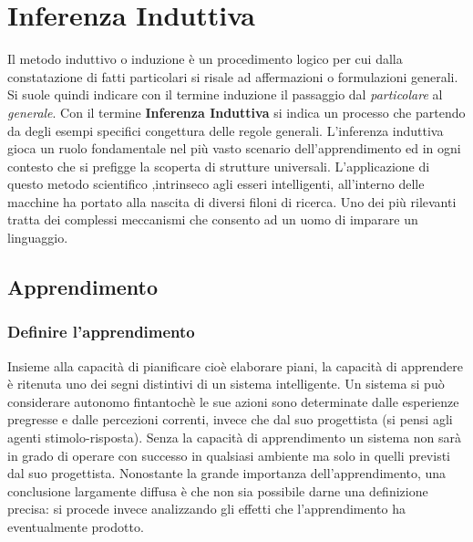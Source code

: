 
\chapter{Inferenza Induttiva} %
\label{cap:uno}

Il metodo induttivo o induzione è un procedimento logico per cui dalla constatazione di fatti particolari si risale ad affermazioni o formulazioni generali.
Si suole quindi indicare con il termine induzione  il passaggio dal \textit{particolare} al \textit{generale}.
Con il termine \textbf{Inferenza Induttiva} si indica un processo che partendo da degli esempi specifici congettura delle regole generali. L'inferenza induttiva gioca un ruolo fondamentale nel più vasto scenario dell'apprendimento ed in ogni contesto che si prefigge la scoperta di strutture universali. L'applicazione di questo metodo scientifico ,intrinseco agli esseri intelligenti, all'interno delle macchine ha portato alla nascita di diversi filoni di ricerca. Uno dei più rilevanti tratta dei complessi meccanismi che consento ad un uomo di imparare un linguaggio. 

\section{Apprendimento}
 
\subsection{Definire l'apprendimento}
\label{sub:defapp}
Insieme alla capacità di pianificare cioè elaborare piani, la capacità di apprendere è ritenuta uno dei segni distintivi di un sistema intelligente. Un sistema si può considerare autonomo fintantochè le sue azioni sono determinate dalle esperienze pregresse e dalle percezioni correnti, invece che dal suo progettista (si pensi agli agenti stimolo-risposta). Senza la capacità di apprendimento un sistema non sarà in grado di operare con successo in qualsiasi ambiente ma solo in quelli previsti dal suo progettista. Nonostante la grande importanza dell'apprendimento, una conclusione largamente diffusa è che non sia possibile darne una definizione precisa: si procede invece analizzando gli effetti che l'apprendimento ha eventualmente prodotto.

